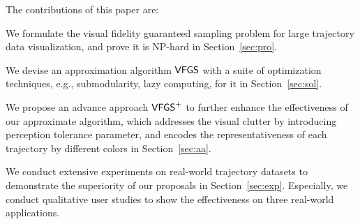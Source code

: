 The contributions of this paper are:
\squishlist
  \item We formulate the visual fidelity guaranteed sampling problem for large trajectory data visualization, and prove it is {NP-hard} in Section~\ref{sec:pro}.
  \item We devise an approximation algorithm $\mathsf{VFGS}$ with a suite of optimization techniques, e.g., submodularity, lazy computing, for it in Section~\ref{sec:sol}.
  \item We propose an advance approach $\mathsf{VFGS}^{+}$ to further enhance the effectiveness of our approximate algorithm, which {addresses} the visual clutter by introducing perception tolerance parameter,
  and encodes the representativeness of each {trajectory} by different colors in Section~\ref{sec:aa}.
  \item We conduct extensive experiments on real-world trajectory datasets to demonstrate the superiority of our proposals in Section~\ref{sec:exp}. Especially, we conduct qualitative user studies to show {the} effectiveness on three real-world applications.
\squishend



%


